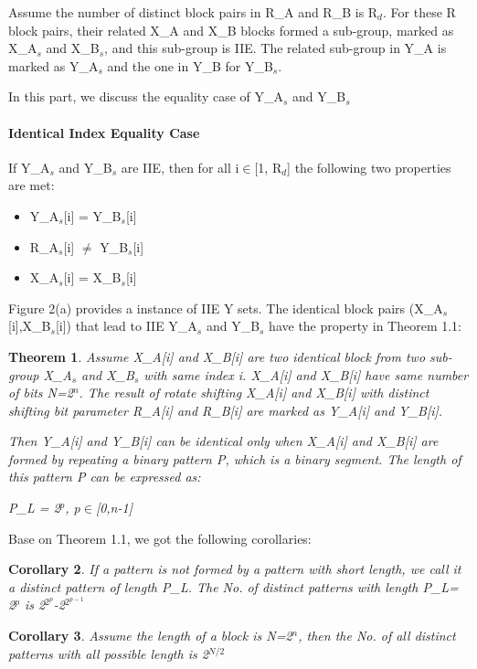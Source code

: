 \documentclass{article}
\newtheorem{theorem}{Theorem}[section]
\newtheorem{corollary}[theorem]{Corollary}
\begin{document}
Assume the number of distinct block pairs in R\_A and R\_B is R$_d$. For these R block pairs, their related X\_A and X\_B blocks formed a sub-group, marked as X\_A$_s$ and X\_B$_s$, and this sub-group is IIE. The related sub-group in Y\_A is marked as Y\_A$_s$ and the one in Y\_B for Y\_B$_s$.

In this part, we discuss the equality case of Y\_A$_s$ and Y\_B$_s$
\paragraph{Identical Index Equality Case}
If Y\_A$_s$ and Y\_B$_s$ are IIE, then for all i$\in$[1, R$_d$] the following two properties are met:
\begin{itemize}
	\item Y\_A$_s$[i] = Y\_B$_s$[i] 
	\item R\_A$_s$[i] $\neq$ Y\_B$_s$[i]
	\item X\_A$_s$[i] = X\_B$_s$[i]
\end{itemize}
Figure 2(a) provides a instance of IIE Y sets.
The identical block pairs (X\_A$_s$[i],X\_B$_s$[i]) that lead to IIE Y\_A$_s$ and Y\_B$_s$ have the property in Theorem 1.1:
\begin{theorem}
Assume X\_A[i] and X\_B[i] are two identical block from two sub-group X\_A$_s$ and X\_B$_s$ with same index i. X\_A[i] and X\_B[i] have same number of bits N=2$^n$. The result of rotate shifting X\_A[i] and X\_B[i] with distinct shifting bit parameter R\_A[i] and R\_B[i] are marked as Y\_A[i] and Y\_B[i]. 

Then Y\_A[i] and Y\_B[i] can be identical only when X\_A[i] and X\_B[i] are formed by repeating a binary pattern P, which is a binary segment. The length of this pattern P can be expressed as:

	P\_L = 2$^p$, p$\in$[0,n-1]
\end{theorem}
Base on Theorem 1.1, we got the following corollaries:
\begin{corollary}
If a pattern is not formed by a pattern with short length, we call it a distinct pattern of length P\_L. The No. of distinct patterns with length P\_L= 2$^p$ is 2$^{2^p}$-2$^{2^{p-1}}$
\end{corollary}
\begin{corollary}
Assume the length of a block is N=2$^n$, then the No. of all distinct patterns with all possible length is 2$^{N/2}$
\end{corollary}
\end{document}

